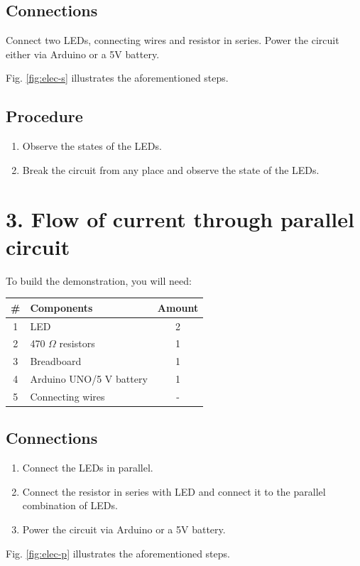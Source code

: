 \subsection*{Connections}
Connect two LEDs, connecting wires and resistor in series. Power the circuit either via Arduino or a 5V battery.

Fig. \ref{fig:elec-s} illustrates the aforementioned steps.

\subsection*{Procedure}
\begin{enumerate}[leftmargin=*]
    \item Observe the states of the LEDs.
    \item Break the circuit from any place and observe the state of the LEDs.
\end{enumerate}

\section*{3. Flow of current through parallel circuit}
To build the demonstration, you will need:

\begin{table}[!ht]
    \centering
    \begin{tabular}{|c|l|c|}\hline
    \textbf{\#} & \textbf{Components}  &  \textbf{Amount}\\\hline
    1   &   LED                     &  2\\\hline
    2   &   470 $\Omega$ resistors  &  1\\\hline
    3   &   Breadboard              &  1\\\hline
    4   &   Arduino UNO/5 V battery &  1\\\hline
    5   &   Connecting wires        &  -\\\hline
    \end{tabular}
\end{table}

\subsection*{Connections}
\begin{enumerate}[leftmargin=*]
    \item Connect the LEDs in parallel. 
    \item Connect the resistor in series with LED and connect it to the parallel combination of LEDs.
    \item Power the circuit via Arduino or a 5V battery.
\end{enumerate}
Fig. \ref{fig:elec-p} illustrates the aforementioned steps.

